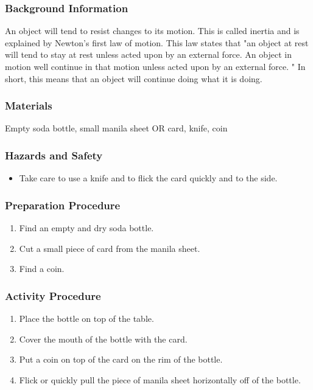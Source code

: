 \subsubsection*{Background Information}
An object will tend to resist changes to its motion. This is called inertia and is explained by Newton's first law of motion. This law states that "an object at rest will tend to stay at rest unless acted upon by an external force. An object in motion well continue in that motion unless acted upon by an external force.  " In short, this means that an object will continue doing what it is doing.  

\subsubsection*{Materials}
Empty soda bottle, small manila sheet OR card, knife, coin

\subsubsection*{Hazards and Safety}
\begin{itemize}
\item{Take care to use a knife and to flick the card quickly and to the side.} 
\end{itemize}

\subsubsection*{Preparation Procedure}
\begin{enumerate}
\item{Find an empty and dry soda bottle.} 
\item{Cut a small piece of card from the manila sheet.} 
\item{Find a coin.} 
\end{enumerate}

\subsubsection*{Activity Procedure}
\begin{enumerate}
\item{Place the bottle on top of the table.} 
\item{Cover the mouth of the bottle with the card.} 
\item{Put a coin on top of the card on the rim of the bottle.} 
\item{Flick or quickly pull the piece of manila sheet horizontally off of the bottle.} 
\end{enumerate}

